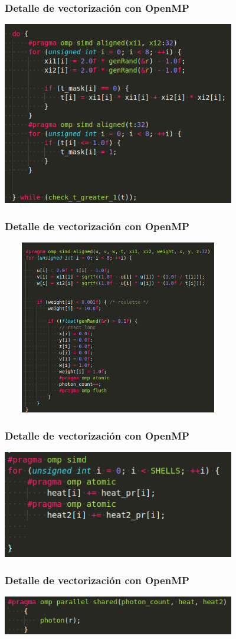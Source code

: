 \documentclass{beamer}
\begin{document}
    \begin{frame}
        \frametitle{Detalle de vectorización con OpenMP}
        \includegraphics[width=4in]{imagenes/omp_vec_5.png}

    \end{frame}

    \begin{frame}
        \frametitle{Detalle de vectorización con OpenMP}
        \includegraphics[width=4in, height=3in]{imagenes/omp_vec_6.png}

    \end{frame}

    \begin{frame}
        \frametitle{Detalle de vectorización con OpenMP}
        \includegraphics[width=4in]{imagenes/omp_vec_7.png}

    \end{frame}

    \begin{frame}
        \frametitle{Detalle de vectorización con OpenMP}
        \includegraphics[width=4in]{imagenes/omp_vec_9.png}

    \end{frame}
\end{document}
